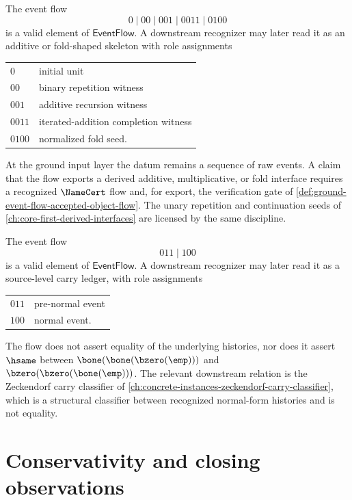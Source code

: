 \begin{example}
\label{ex:ground-event-flow-add-fold-skeleton}
The event flow
$$
  0 \mid 00 \mid 001 \mid 0011 \mid 0100
$$
is a valid element of $\mathsf{EventFlow}$. A downstream recognizer may later read it as an additive or fold-shaped skeleton with role assignments
\begin{center}
\begin{tabular}{ll}
  $0$     & initial unit \\
  $00$    & binary repetition witness \\
  $001$   & additive recursion witness \\
  $0011$  & iterated-addition completion witness \\
  $0100$  & normalized fold seed.
\end{tabular}
\end{center}
At the ground input layer the datum remains a sequence of raw events. A claim that the flow exports a derived additive, multiplicative, or fold interface requires a recognized $\NameCert$ flow and, for export, the verification gate of \autoref{def:ground-event-flow-accepted-object-flow}. The unary repetition and continuation seeds of \autoref{ch:core-first-derived-interfaces} are licensed by the same discipline.
\end{example}

\begin{example}
\label{ex:ground-event-flow-carry-ledger}
The event flow
$$
  011 \mid 100
$$
is a valid element of $\mathsf{EventFlow}$. A downstream recognizer may later read it as a source-level carry ledger, with role assignments
\begin{center}
\begin{tabular}{ll}
  $011$ & pre-normal event \\
  $100$ & normal event.
\end{tabular}
\end{center}
The flow does not assert equality of the underlying histories, nor does it assert $\hsame$ between $\bone(\bone(\bzero(\emp)))$ and $\bzero(\bzero(\bone(\emp)))$. The relevant downstream relation is the Zeckendorf carry classifier of \autoref{ch:concrete-instances-zeckendorf-carry-classifier}, which is a structural classifier between recognized normal-form histories and is not equality.
\end{example}

\section{Conservativity and closing observations}
\label{sec:ground-event-flow-conservativity}

